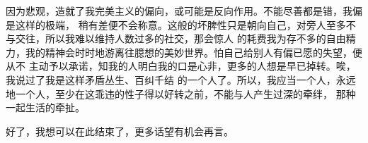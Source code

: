 \begin{adjustwidth}{0cm}{0cm}
{        \hspace*{2em} 因为悲观，造就了我完美主义的偏向，或可能是反向作用。不能尽善都是错，我偏是这样的极端，
        稍有差便不会称意。这般的坏脾性只是朝向自己，对旁人至多不与交往，所以我难以维持人数过多的社交，那会惊人
        的耗费我为存不多的自由精力，我的精神会时时地游离往臆想的美妙世界。怕自己给别人有偏已愿的失望，便从不
        主动予以承诺，知我的人明白我的口是心非，更多的人想是早已掉转。唉，我说过了我是这样矛盾丛生、百纠千结
        的一个人了。所以，我应当一个人，永远地一个人，至少在这乖违的性子得以好转之前，不能与人产生过深的牵绊，
        那种一起生活的牵扯。

        \hspace*{2em} 好了，我想可以在此结束了，更多话望有机会再言。

}
\end{adjustwidth}
\newpage